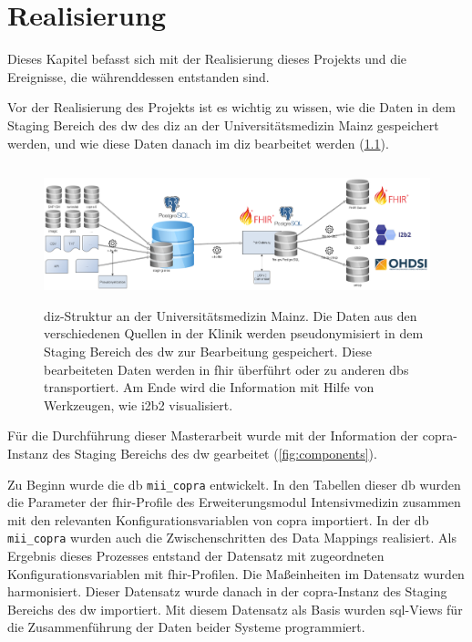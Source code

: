 \chapter{Realisierung} \label{ch:results}

Dieses Kapitel befasst sich mit der Realisierung dieses Projekts und die Ereignisse, die währenddessen entstanden sind.

Vor der Realisierung des Projekts ist es wichtig zu wissen, wie die Daten in dem Staging Bereich des \ac{dw} des \ac{diz} an der Universitätsmedizin Mainz gespeichert werden, und wie diese Daten danach im \ac{diz} bearbeitet werden (\ref{fig:dizummz}).

\begin{figure}[ht]
	\centering
	\includegraphics[height=4cm]{figures/diz_ummz}
	\caption[\acs{diz}-Struktur an der Universitätsmedizin Mainz] {\acs{diz}-Struktur an der Universitätsmedizin Mainz. Die Daten aus den verschiedenen Quellen in der Klinik werden pseudonymisiert in dem Staging Bereich des \ac{dw} zur Bearbeitung gespeichert. Diese bearbeiteten Daten werden in \ac{fhir} überführt oder zu anderen \acp{db} transportiert. Am Ende wird die Information mit Hilfe von Werkzeugen, wie i2b2 visualisiert.}
	\label{fig:dizummz}
\end{figure}

 Für die Durchführung dieser Masterarbeit wurde mit der Information der \ac{copra}-Instanz des Staging Bereichs des \ac{dw} gearbeitet (\ref{fig:components}).

 Zu Beginn wurde die \ac{db} \texttt{mii\_copra} entwickelt. In den Tabellen dieser \ac{db} wurden die Parameter der \ac{fhir}-Profile des Erweiterungsmodul \glqq Intensivmedizin\grqq{} zusammen mit den relevanten Konfigurationsvariablen von \ac{copra} importiert. In der \ac{db} \texttt{mii\_copra} wurden auch die Zwischenschritten des Data Mappings realisiert. Als Ergebnis dieses Prozesses entstand der Datensatz mit  zugeordneten Konfigurationsvariablen mit \ac{fhir}-Profilen. Die Maßeinheiten im Datensatz wurden harmonisiert. Dieser Datensatz wurde danach in der \ac{copra}-Instanz des Staging Bereichs des \ac{dw} importiert. Mit diesem Datensatz als Basis wurden \ac{sql}-Views für die Zusammenführung der Daten beider Systeme programmiert.

